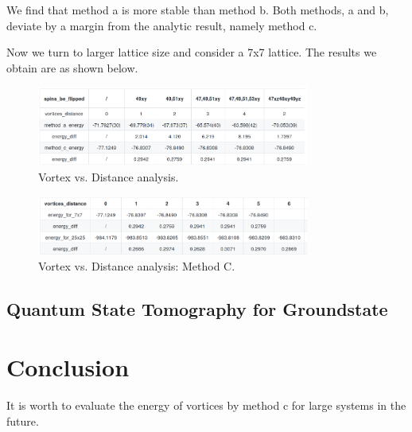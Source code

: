 \documentclass{article}
\begin{document}
We find that method a is more stable than method b. Both methods, a and b, deviate by a margin from the analytic result, namely method c. 

Now we turn to larger lattice size and consider a 7x7 lattice. The results we obtain are as shown below.

\begin{figure}[!htb]
	\centering
	\includegraphics[width=0.8\textwidth]{./images/vort_dis.png}
	\caption{\label{tab:vort_dis} Vortex vs. Distance analysis.} 
\end{figure}


\begin{figure}[!htb]
	\centering
	\includegraphics[width=0.8\textwidth]{./images/vort_dis_c.png}
	\caption{\label{tab:vort_dis} Vortex vs. Distance analysis: Method C.} 
\end{figure}


\subsection{Quantum State Tomography for Groundstate}\label{sec5.3}




\section{Conclusion}\label{sec6}
\label{sec:conclusion}
It is worth to evaluate the energy of vortices by method c for large systems in the future.
\end{document}
